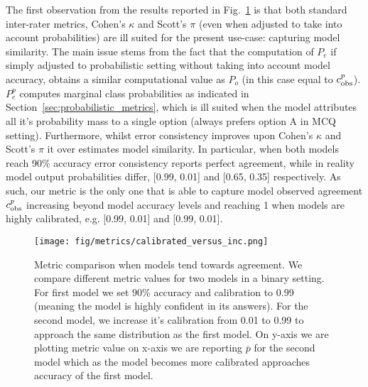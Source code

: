 The first observation from the results reported in Fig.~\ref{fig:metric_comp} is that both standard inter-rater metrics, Cohen's $\kappa$ and Scott's $\pi$ (even when adjusted to take into account probabilities) are ill suited for the present use-case: capturing model similarity. The main issue stems from the fact that the computation of $P_e$ if simply adjusted to probabilistic setting without taking into account model accuracy, obtains a similar computational value as $P_o$ (in this case equal to $c_{\text{obs}}^{p}$). $P_e^p$ computes marginal class probabilities as indicated in Section~\ref{sec:probabilistic_metrics}, which is ill suited when the model attributes all it's probability mass to a single option (always prefers option A in MCQ setting). Furthermore, whilst error consistency improves upon Cohen's $\kappa$ and Scott's $\pi$ it over estimates model similarity. In particular, when both models reach 90\% accuracy error consistency reports perfect agreement, while in reality model output probabilities differ, [0.99, 0.01] and [0.65, 0.35] respectively. As such, our metric is the only one that is able to capture model observed agreement $c_{\text{obs}}^{p}$ increasing beyond model accuracy levels and reaching 1 when models are highly calibrated, e.g. [0.99, 0.01] and [0.99, 0.01]. 

\begin{figure}[H]
    \centering
    \texttt{[image: fig/metrics/calibrated\_versus\_inc.png]}
    \caption{Metric comparison when models tend towards agreement. We compare different metric values for two models in a binary setting. For first model we set 90\% accuracy and calibration to 0.99 (meaning the model is highly confident in its answers). For the second model, we increase it's calibration from 0.01 to 0.99 to approach the same distribution as the first model. On y-axis we are plotting metric value on x-axis we are reporting $\overline{p}$ for the second model which as the model becomes more calibrated approaches accuracy of the first model.}
    \label{fig:metric_comp}
\end{figure}


